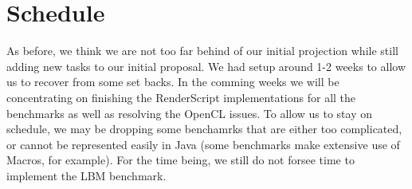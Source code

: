 
\section*{Schedule}

As before, we think we are not too far behind of our initial 
  projection while still adding new tasks to our initial proposal.
We had setup around 1-2 weeks to allow us to recover 
  from some set backs.
In the comming weeks we will be concentrating on finishing the 
  RenderScript implementations for all the benchmarks as well
  as resolving the OpenCL issues.
To allow us to stay on schedule, we may be dropping some benchamrks that
  are either too complicated, or cannot be represented easily in Java 
  (some benchmarks make extensive use of Macros, for example).
For the time being, we still do not forsee time to implement the LBM benchmark.
